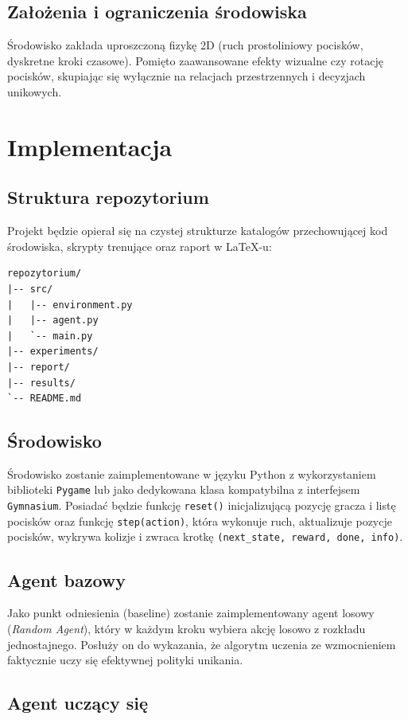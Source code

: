 \documentclass[12pt]{article}
\begin{document}
\subsection{Założenia i ograniczenia środowiska}
Środowisko zakłada uproszczoną fizykę 2D (ruch prostoliniowy pocisków, dyskretne kroki czasowe). Pomięto zaawansowane efekty wizualne czy rotację pocisków, skupiając się wyłącznie na relacjach przestrzennych i decyzjach unikowych.

\section{Implementacja}

\subsection{Struktura repozytorium}
Projekt będzie opierał się na czystej strukturze katalogów przechowującej kod środowiska, skrypty trenujące oraz raport w LaTeX-u:

\begin{verbatim}
repozytorium/
|-- src/
|   |-- environment.py
|   |-- agent.py
|   `-- main.py
|-- experiments/
|-- report/
|-- results/
`-- README.md
\end{verbatim}

\subsection{Środowisko}
Środowisko zostanie zaimplementowane w języku Python z wykorzystaniem biblioteki \texttt{Pygame} lub jako dedykowana klasa kompatybilna z interfejsem \texttt{Gymnasium}. Posiadać będzie funkcję \texttt{reset()} inicjalizującą pozycję gracza i listę pocisków oraz funkcję \texttt{step(action)}, która wykonuje ruch, aktualizuje pozycje pocisków, wykrywa kolizje i zwraca krotkę \texttt{(next\_state, reward, done, info)}.

\subsection{Agent bazowy}
Jako punkt odniesienia (baseline) zostanie zaimplementowany agent losowy (\textit{Random Agent}), który w każdym kroku wybiera akcję losowo z rozkładu jednostajnego. Posłuży on do wykazania, że algorytm uczenia ze wzmocnieniem faktycznie uczy się efektywnej polityki unikania.

\subsection{Agent uczący się}
\end{document}

